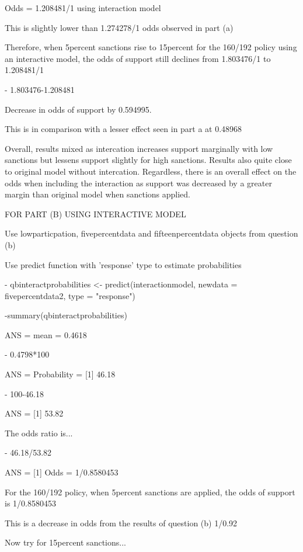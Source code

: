 \documentclass[12pt,letterpaper]{article}
\begin{document}
\begin{enumerate}
\begin{enumerate}
[1] Odds = 1.208481/1 using interaction model

This is slightly lower than 1.274278/1 odds observed in part (a)
\vspace{1cm}

Therefore, when 5percent sanctions rise to 15percent for the 160/192 policy using an interactive model, the odds of support still declines from 1.803476/1 to 1.208481/1 

	- 1.803476-1.208481

Decrease in odds of support by 0.594995. 

This is in comparison with a lesser effect seen in part a at 0.48968
\vspace{1cm}

Overall, results mixed as intercation increases support marginally with low sanctions but lessens support slightly for high sanctions. Results also quite close to original model without intercation. Regardless, there is an overall effect on the odds when including the interaction as support was decreased by a greater margin than original model when sanctions applied. 

\vspace{2cm}

FOR PART (B) USING INTERACTIVE MODEL

Use lowparticpation, fivepercentdata and fifteenpercentdata objects from question (b)

Use predict function with 'response' type to estimate probabilities

	- qbinteractprobabilities <- predict(interactionmodel, newdata = fivepercentdata2, type = "response")
	
	-summary(qbinteractprobabilities) 
	
	ANS = mean = 0.4618

	- 0.4798*100

ANS = Probability = [1] 46.18%

	- 100-46.18 

ANS =  [1] 53.82

The odds ratio is...

	- 46.18/53.82 

ANS = [1] Odds = 1/0.8580453

For the 160/192 policy, when 5percent sanctions are applied, the odds of support is 1/0.8580453

This is a decrease in odds from the results of question (b) 1/0.92

\vspace{1cm}
Now try for 15percent sanctions...


\end{enumerate}
\end{enumerate}
\end{document}
